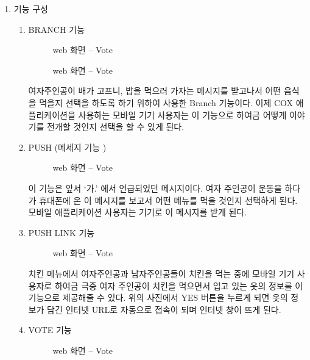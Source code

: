\documentclass{oblivoir}
\begin{document}
\begin{enumerate}
\item 기능 구성

    \begin{enumerate}%
        \item BRANCH 기능

        \begin{figure}[h!]
            \centering
            \caption{web 화면 – Vote}
        \end{figure} 

        \begin{figure}[h!]
            \centering
            \caption{web 화면 – Vote}
        \end{figure} 

        여자주인공이 배가 고프니, 밥을 먹으러 가자는 메시지를 받고나서 어떤 음식을 먹을지 선택을 하도록 하기 위하여 사용한 Branch 기능이다. 이제 COX 애플리케이션을 사용하는 모바일 기기 사용자는 이 기능으로 하여금 어떻게 이야기를 전개할 것인지 선택을 할 수 있게 된다. 

        \item PUSH (메세지 기능 )

        \begin{figure}[h!]
            \centering
            \caption{web 화면 – Vote}
        \end{figure} 

    이 기능은 앞서 ‘가.’ 에서 언급되었던 메시지이다. 여자 주인공이 운동을 하다가 휴대폰에 온 이 메시지를 보고서 어떤 메뉴를 먹을 것인지 선택하게 된다. 모바일 애플리케이션 사용자는 기기로 이 메시지를 받게 된다.

        \item PUSH LINK 기능
        
        \begin{figure}[h!]
            \centering
            \caption{web 화면 – Vote}
        \end{figure} 

    치킨 메뉴에서 여자주인공과 남자주인공들이 치킨을 먹는 중에 모바일 기기 사용자로 하여금 극중 여자 주인공이 치킨을 먹으면서 입고 있는 옷의 정보를 이 기능으로 제공해줄 수 있다. 위의 사진에서 YES 버튼을 누르게 되면 옷의 정보가 담긴 인터넷 URL로 자동으로 접속이 되며 인터넷 창이 뜨게 된다.

        \item VOTE 기능

        \begin{figure}[h!]
            \centering
            \caption{web 화면 – Vote}
        \end{figure} 


\end{enumerate}
\end{enumerate}
\end{document}
